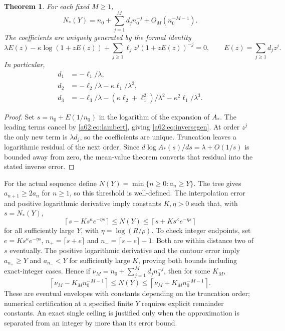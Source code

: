 \documentclass[11pt,letterpaper]{article}
\newtheorem{theorem}{Theorem}[section]
\theoremstyle{remark}\newtheorem{remark}[theorem]{Remark}
\begin{document}
\begin{theorem}\label{a62:thm:inverse}
For each fixed $M\ge1$,
\[
 N_*(Y)=n_0+\sum_{j=1}^Md_jn_0^{-j}+O_M(n_0^{-M-1}).
\]
The coefficients are uniquely generated by the formal identity
\begin{equation}\label{a62:eq:inversegen}
 \lambda E(z)-\kappa\log(1+zE(z))
 +\sum_{j\ge1}\ell_jz^j(1+zE(z))^{-j}=0,
 \qquad E(z)=\sum_{j\ge1}d_jz^j.
\end{equation}
In particular,
\begin{align*}
 d_1&=-\ell_1/\lambda,\\
 d_2&=-\ell_2/\lambda-\kappa\ell_1/\lambda^2,\\
 d_3&=-\ell_3/\lambda-(\kappa\ell_2+\ell_1^2)/\lambda^2
                       -\kappa^2\ell_1/\lambda^3.
\end{align*}
\end{theorem}
\begin{proof}
Set $s=n_0+E(1/n_0)$ in the logarithm of the expansion of $A_*$. The leading terms cancel by \eqref{a62:eq:lambert}, giving \eqref{a62:eq:inversegen}. At order $z^j$ the only new term is $\lambda d_j$, so the coefficients are unique. Truncation leaves a logarithmic residual of the next order. Since $d\log A_*(s)/ds=\lambda+O(1/s)$ is bounded away from zero, the mean-value theorem converts that residual into the stated inverse error.
\end{proof}

For the actual sequence define $N(Y)=\min\{n\ge0:a_n\ge Y\}$. The tree gives $a_{n+1}\ge2a_n$ for $n\ge1$, so this threshold is well-defined. The interpolation error and positive logarithmic derivative imply constants $K,\eta>0$ such that, with $s=N_*(Y)$,
\[
 \left\lceil s-Ks^\kappa e^{-\eta s}\right\rceil
 \le N(Y)\le
 \left\lceil s+Ks^\kappa e^{-\eta s}\right\rceil
\]
for all sufficiently large $Y$, with $\eta=\log(R/\rho)$. To check integer endpoints, set $e=Ks^\kappa e^{-\eta s}$, $n_+=\lceil s+e\rceil$ and $n_-=\lceil s-e\rceil-1$. Both are within distance two of $s$ eventually. The positive logarithmic derivative and the contour error imply $a_{n_+}\ge Y$ and $a_{n_-}<Y$ for sufficiently large $K$, proving both bounds including exact-integer cases. Hence if $\nu_M=n_0+\sum_{j=1}^Md_jn_0^{-j}$, then for some $K_M$,
\[
 \left\lceil\nu_M-K_Mn_0^{-M-1}\right\rceil
 \le N(Y)\le
 \left\lceil\nu_M+K_Mn_0^{-M-1}\right\rceil.
\]
These are eventual envelopes with constants depending on the truncation order; numerical certification at a specified finite $Y$ requires explicit remainder constants. An exact single ceiling is justified only when the approximation is separated from an integer by more than its error bound.
\end{document}
